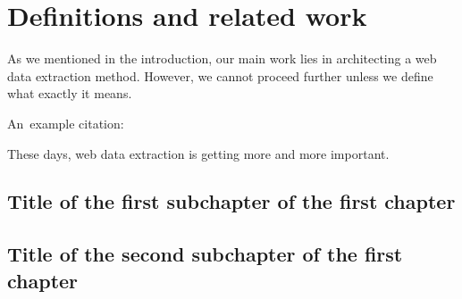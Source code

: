 \chapter{Definitions and related work}

As we mentioned in the introduction, our main work lies in architecting a web data extraction method.
However, we cannot proceed further unless we define what exactly it means.





An~example citation: \cite{Andel07}

These days, web data extraction is getting more and more important.
\section{Title of the first subchapter of the first chapter}

\section{Title of the second subchapter of the first chapter}
